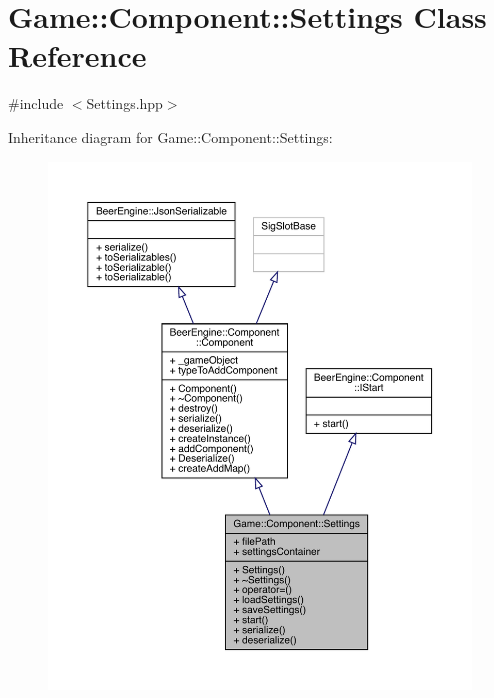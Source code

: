 \hypertarget{class_game_1_1_component_1_1_settings}{}\section{Game\+:\+:Component\+:\+:Settings Class Reference}
\label{class_game_1_1_component_1_1_settings}


{\ttfamily \#include $<$Settings.\+hpp$>$}



Inheritance diagram for Game\+:\+:Component\+:\+:Settings\+:\nopagebreak
\begin{figure}[H]
\begin{center}
\leavevmode
\includegraphics[width=350pt]{class_game_1_1_component_1_1_settings__inherit__graph}
\end{center}
\end{figure}


